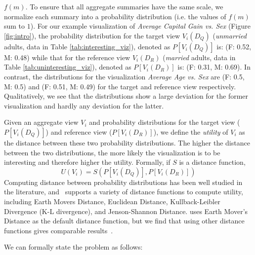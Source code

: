 $f(m)$. 
To ensure that all aggregate summaries have the same scale, we normalize each 
summary into a probability distribution (i.e. the values of $f(m)$ sum to $1$).
For our example visualization of {\em Average Capital Gain vs. Sex} (Figure \ref{fig:intro}),
the probability distribution for the target view $V_i(D_Q)$ ({\em unmarried} adults, data 
in Table \ref{tab:interesting_viz}), 
denoted as $P[V_i (D_Q)]$ is: 
(F: 0.52, M: 0.48) while that for the reference view $V_i(D_R)$ ({\em married} adults, data 
in Table \ref{tab:uninteresting_viz}), 
denoted as $P[V_i (D_R)]$ is:
(F: 0.31, M: 0.69). 
In contrast, the distributions for the visualization {\em Average Age
vs. Sex} are (F: 0.5, M: 0.5) and (F: 0.51, M: 0.49) 
for the target and reference view respectively.
Qualitatively, we see that the distributions show a large deviation for
the former visualization and hardly any deviation for the latter.

Given an aggregate view $V_i$ and probability distributions for the
target view  ($P[V_i (D_Q)]$) and reference view ($P[V_i (D_R)]$), we
define the {\em utility} of $V_i$ as the distance between these two probability
distributions. The higher the distance between the two distributions, the more 
likely the
visualization is to be interesting and therefore higher the utility.
Formally, if $S$ is a distance function,
$$ U (V_i) = S ( P[V_i (D_Q)], P[V_i (D_R)] )$$
Computing distance between probability distributions has
been well studied in the literature, and \SeeDB\ supports a variety of distance
functions
to compute utility, including Earth Movers Distance, 
Euclidean Distance, Kullback-Leibler Divergence (K-L
divergence), and Jenson-Shannon
Distance. 
\SeeDB uses Earth Mover's Distance as the default distance function,
but we find that using other distance functions gives comparable results~\cite{seedb-tr}.


We can formally state the \SeeDB problem as follows:

